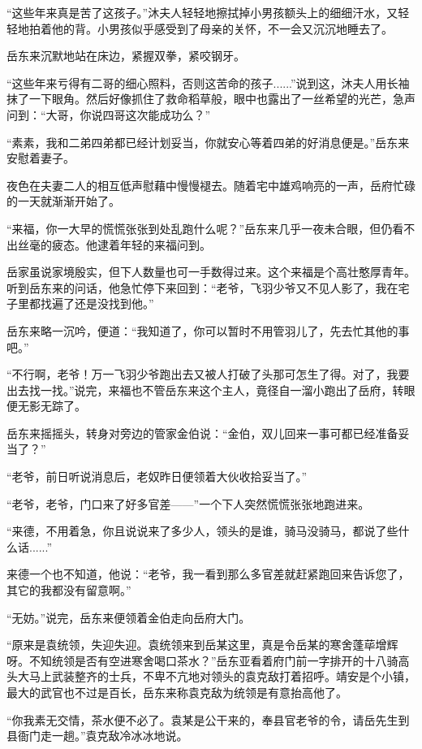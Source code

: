 “这些年来真是苦了这孩子。”沐夫人轻轻地擦拭掉小男孩额头上的细细汗水，又轻轻地拍着他的背。小男孩似乎感受到了母亲的关怀，不一会又沉沉地睡去了。

岳东来沉默地站在床边，紧握双拳，紧咬钢牙。

“这些年来亏得有二哥的细心照料，否则这苦命的孩子......”说到这，沐夫人用长袖抹了一下眼角。然后好像抓住了救命稻草般，眼中也露出了一丝希望的光芒，急声问到：“大哥，你说四哥这次能成功么？”

“素素，我和二弟四弟都已经计划妥当，你就安心等着四弟的好消息便是。”岳东来安慰着妻子。

夜色在夫妻二人的相互低声慰藉中慢慢褪去。随着宅中雄鸡响亮的一声，岳府忙碌的一天就渐渐开始了。

\splitline

“来福，你一大早的慌慌张张到处乱跑什么呢？”岳东来几乎一夜未合眼，但仍看不出丝毫的疲态。他逮着年轻的来福问到。

岳家虽说家境殷实，但下人数量也可一手数得过来。这个来福是个高壮憨厚青年。听到岳东来的问话，他急忙停下来回到：“老爷，飞羽少爷又不见人影了，我在宅子里都找遍了还是没找到他。”

岳东来略一沉吟，便道：“我知道了，你可以暂时不用管羽儿了，先去忙其他的事吧。”

“不行啊，老爷！万一飞羽少爷跑出去又被人打破了头那可怎生了得。对了，我要出去找一找。”说完，来福也不管岳东来这个主人，竟径自一溜小跑出了岳府，转眼便无影无踪了。

岳东来摇摇头，转身对旁边的管家金伯说：“金伯，双儿回来一事可都已经准备妥当了？”

“老爷，前日听说消息后，老奴昨日便领着大伙收拾妥当了。”

“老爷，老爷，门口来了好多官差------”一个下人突然慌慌张张地跑进来。

“来德，不用着急，你且说说来了多少人，领头的是谁，骑马没骑马，都说了些什么话......”

来德一个也不知道，他说：“老爷，我一看到那么多官差就赶紧跑回来告诉您了，其它的我都没有留意啊。”

“无妨。”说完，岳东来便领着金伯走向岳府大门。

\splitline

“原来是袁统领，失迎失迎。袁统领来到岳某这里，真是令岳某的寒舍蓬荜增辉呀。不知统领是否有空进寒舍喝口茶水？”岳东亚看着府门前一字排开的十八骑高头大马上武装整齐的士兵，不卑不亢地对领头的袁克敌打着招呼。靖安是个小镇，最大的武官也不过是百长，岳东来称袁克敌为统领是有意抬高他了。

“你我素无交情，茶水便不必了。袁某是公干来的，奉县官老爷的令，请岳先生到县衙门走一趟。”袁克敌冷冰冰地说。

